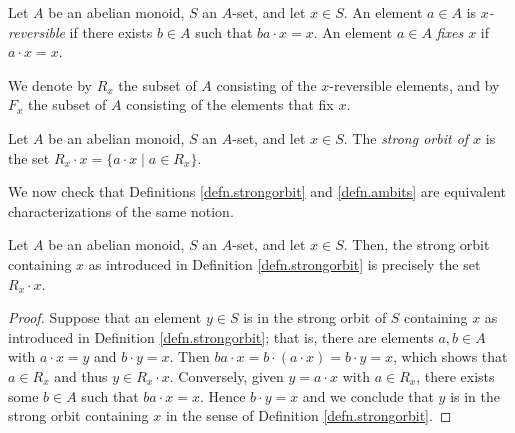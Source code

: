 \documentclass[11pt]{amsart}
\begin{document}
\begin{definition}
    Let $A$ be an abelian monoid, $S$ an $A$-set, and let $x\in S$.  An element $a\in A$ is \emph{$x$-reversible} if there exists $b\in A$ such that $ba\cdot x = x$.    %
    An element $a\in A$ \emph{fixes $x$} if $a \cdot x = x$. 
    \end{definition}

\begin{notation}
    We denote by $R_x$  the subset of $A$ consisting of the $x$-reversible elements, and by $F_x$ the subset of $A$ consisting of the elements that fix $x$.  
\end{notation}





\begin{definition}\label{defn.ambits}
  Let $A$ be an abelian monoid, $S$ an $A$-set, and let $x\in S$.  The \emph{strong orbit of $x$} is the set $R_x \cdot x=\{a\cdot x \mid a\in R_x\}$.
\end{definition}

We now check that Definitions \ref{defn.strongorbit} and \ref{defn.ambits} are equivalent characterizations of the same notion.

\begin{lemma}
     Let $A$ be an abelian monoid, $S$ an $A$-set, and let $x\in S$. Then, the strong orbit containing $x$ as introduced in Definition \ref{defn.strongorbit} is precisely the set $R_x \cdot x$.
\end{lemma}
\begin{proof}
    Suppose that an element $y\in S$ is in the strong orbit of $S$ containing $x$ as introduced in Definition \ref{defn.strongorbit}; that is, there are elements $a,b\in A$ with $a\cdot x=y$ and $b\cdot y=x$. Then $ba\cdot x=b\cdot(a\cdot x)=b\cdot y=x$, which shows that $a\in R_x$ and thus $y\in R_x\cdot x$. Conversely, given $y=a\cdot x$ with $a\in R_x$, there exists some $b\in A$ such that $ba\cdot x=x$. Hence $b\cdot y=x$ and we conclude that $y$ is in the strong orbit containing $x$ in the sense of  Definition \ref{defn.strongorbit}.
\end{proof}
\end{document}
